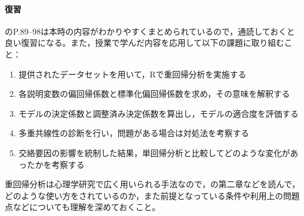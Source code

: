 \paragraph{復習}
\textcite{Toyoda201706}のP.89--98は本時の内容がわかりやすくまとめられているので，通読しておくと良い復習になる。また，授業で学んだ内容を応用して以下の課題に取り組むこと：

\begin{enumerate}
\item 提供されたデータセットを用いて，Rで重回帰分析を実施する
\item 各説明変数の偏回帰係数と標準化偏回帰係数を求め，その意味を解釈する
\item モデルの決定係数と調整済み決定係数を算出し，モデルの適合度を評価する
\item 多重共線性の診断を行い，問題がある場合は対処法を考察する
\item 交絡要因の影響を統制した結果，単回帰分析と比較してどのような変化があったかを考察する
\end{enumerate}

重回帰分析は心理学研究で広く用いられる手法なので，\textcite{kosugi2016a}の第二章などを読んで，どのような使い方をされているのか，また前提となっている条件や利用上の問題点などについても理解を深めておくこと。